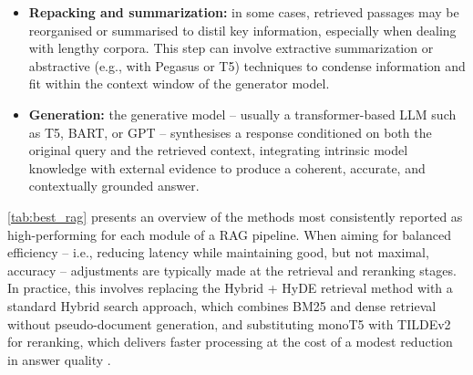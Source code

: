 \begin{spacing}{1.5}
\begin{itemize}
    \item \textbf{Repacking and summarization:} in some cases, retrieved passages may be reorganised or summarised to distil key information, especially when dealing with lengthy corpora. This step can involve extractive summarization or abstractive (e.g., with Pegasus or T5) techniques to condense information and fit within the context window of the generator model.
    \item \textbf{Generation:} the generative model -- usually a transformer-based LLM such as T5, BART, or GPT -- synthesises a response conditioned on both the original query and the retrieved context, integrating intrinsic model knowledge with external evidence to produce a coherent, accurate, and contextually grounded answer.
\end{itemize}


\autoref{tab:best_rag} presents an overview of the methods most consistently reported as high-performing for each module of a RAG pipeline. When aiming for balanced efficiency -- i.e., reducing latency while maintaining good, but not maximal, accuracy -- adjustments are typically made at the retrieval and reranking stages. In practice, this involves replacing the Hybrid + HyDE retrieval method with a standard Hybrid search approach, which combines BM25 and dense retrieval without pseudo-document generation, and substituting monoT5 with TILDEv2 for reranking, which delivers faster processing at the cost of a modest reduction in answer quality \citep{wang_searching_2024}.


\end{spacing}
